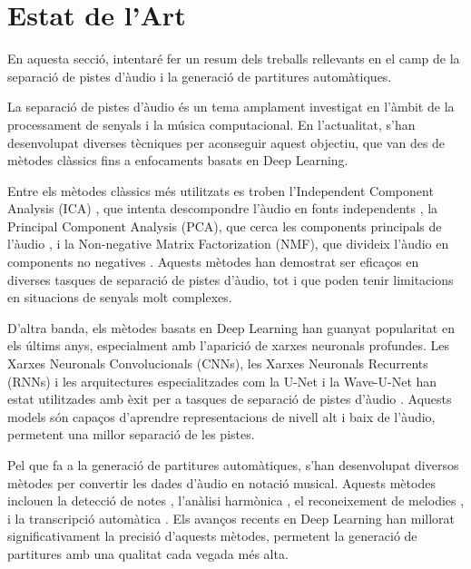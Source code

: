 \documentclass[10pt,a4paper,twocolumn,twoside]{article}
\begin{document}
\section{Estat de l'Art}
\label{sec:estat_art}

En aquesta secció, intentaré fer un resum dels treballs rellevants en el camp de la separació de pistes d'àudio i la generació de partitures automàtiques.

La separació de pistes d'àudio és un tema amplament investigat en l'àmbit de la processament de senyals i la música computacional. En l'actualitat, s'han desenvolupat diverses tècniques per aconseguir aquest objectiu, que van des de mètodes clàssics fins a enfocaments basats en Deep Learning.

Entre els mètodes clàssics més utilitzats es troben l'Independent Component Analysis (ICA) \cite{ICA_Sawada_Ono_Kameoka_Kitamura_Saruwatari_2019}, que intenta descompondre l'àudio en fonts independents \cite{ICA_hyvarinen2000independent}, la Principal Component Analysis (PCA), que cerca les components principals de l'àudio \cite{PCA_jolliffe2002principal}, i la Non-negative Matrix Factorization (NMF), que divideix l'àudio en components no negatives \cite{NMF_lee1999learning}. Aquests mètodes han demostrat ser eficaços en diverses tasques de separació de pistes d'àudio, tot i que poden tenir limitacions en situacions de senyals molt complexes.

D'altra banda, els mètodes basats en Deep Learning han guanyat popularitat en els últims anys, especialment amb l'aparició de xarxes neuronals profundes. Les Xarxes Neuronals Convolucionals (CNNs), les Xarxes Neuronals Recurrents (RNNs) i les arquitectures especialitzades com la U-Net i la Wave-U-Net han estat utilitzades amb èxit per a tasques de separació de pistes d'àudio \cite{hershey2016deep,grill2017two,CNN_jansson2017singing,lva2018waveunet}. Aquests models són capaços d'aprendre representacions de nivell alt i baix de l'àudio, permetent una millor separació de les pistes.

Pel que fa a la generació de partitures automàtiques, s'han desenvolupat diversos mètodes per convertir les dades d'àudio en notació musical. Aquests mètodes inclouen la detecció de notes \cite{raffel2014mir_eval}, l'anàlisi harmònica \cite{pardo2002improved}, el reconeixement de melodies \cite{abdallah2004fundamental}, i la transcripció automàtica \cite{benetos2013automatic}. Els avanços recents en Deep Learning han millorat significativament la precisió d'aquests mètodes, permetent la generació de partitures amb una qualitat cada vegada més alta.
\end{document}
